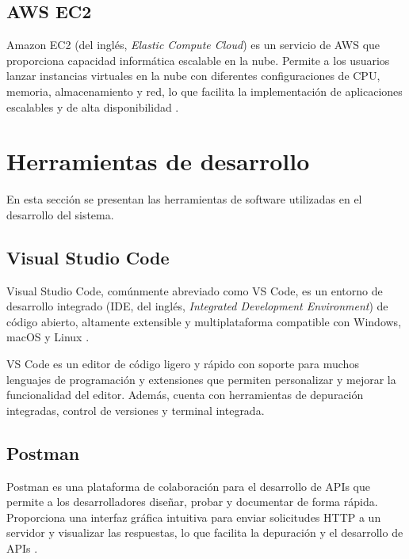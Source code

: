 \subsection{AWS EC2}

Amazon EC2 (del inglés, \textit{Elastic Compute Cloud}) es un servicio de AWS
que proporciona capacidad informática escalable en la nube. Permite a los
usuarios lanzar instancias virtuales en la nube con diferentes configuraciones
de CPU, memoria, almacenamiento y red, lo que facilita la implementación de
aplicaciones escalables y de alta disponibilidad \cite{AWS_EC2}.


\section{Herramientas de desarrollo}

En esta sección se presentan las herramientas de software utilizadas en el
desarrollo del sistema.

\subsection{Visual Studio Code}

Visual Studio Code, comúnmente abreviado como VS Code, es un entorno de
desarrollo integrado (IDE, del inglés, \textit{Integrated Development
	Environment}) de código abierto, altamente extensible y multiplataforma
compatible con Windows, macOS y Linux \cite{VSCode}.

VS Code es un editor de código ligero y rápido con soporte para muchos %
lenguajes de programación y extensiones que permiten personalizar y mejorar la
funcionalidad del editor. Además, cuenta con herramientas de depuración
integradas, control de versiones y terminal integrada.

\subsection{Postman}

Postman es una plataforma de colaboración para el desarrollo de APIs que
permite a los desarrolladores diseñar, probar y documentar de forma rápida.
Proporciona una interfaz gráfica intuitiva para enviar solicitudes HTTP a un
servidor y visualizar las respuestas, lo que facilita la depuración y el
desarrollo de APIs \cite{Postman}.

